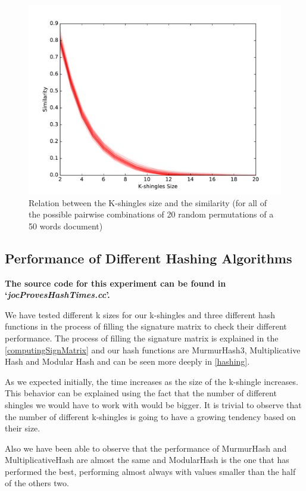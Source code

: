 \documentclass[12pt]{article}
\begin{document}
{\begin{figure}[H]
	\centering
	\includegraphics[scale=0.5]{graphs/JaccardSimilarityValueKshingles.pdf} 
	\caption{Relation between the K-shingles size and the similarity (for all of the possible pairwise combinations of 20 random permutations of a 50 words document)}
	\label{fig:KShinglesSimilarity}
\end{figure}

\subsection{Performance of Different Hashing Algorithms}
\textbf{The source code for this experiment can be found in `\textit{jocProvesHashTimes.cc}'.}
\bigskip

We have tested different k sizes for our k-shingles and three different hash functions in the process of filling the signature matrix to check their different performance. The process of filling the signature matrix is explained in the \autoref{computingSignMatrix} and our hash functions are MurmurHash3, Multiplicative Hash and Modular Hash and can be seen more deeply in \autoref{hashing}.

As we expected initially, the time increases as the size of the k-shingle increases. This behavior can be explained using the fact that the number of different shingles we would have to work with would be bigger. It is trivial to observe that the number of different k-shingles is going to have a growing tendency based on their size. 

Also we have been able to observe that the performance of MurmurHash and MultiplicativeHash are almost the same and ModularHash is the one that has performed the best, performing almost always with values smaller than the half of the others two.



}
\end{document}
